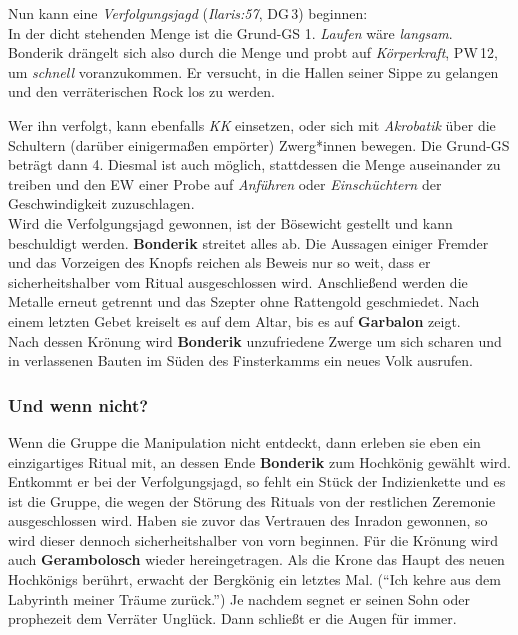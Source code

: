 Nun kann eine \emph{Verfolgungsjagd} (\emph{Ilaris:57}, DG\,3) beginnen:\\
In der dicht stehenden Menge ist die Grund-GS 1. \emph{Laufen} wäre \emph{langsam}.
Bonderik drängelt sich also durch die Menge und probt auf \emph{Körperkraft}, PW\,12, um \emph{schnell} voranzukommen. Er versucht, in die Hallen seiner Sippe zu gelangen und den verräterischen Rock los zu werden.

Wer ihn verfolgt, kann ebenfalls \emph{KK} einsetzen, oder sich mit \emph{Akrobatik} über die Schultern (darüber einigermaßen empörter) Zwerg*innen bewegen. Die Grund-GS beträgt dann 4. Diesmal ist auch möglich, stattdessen die Menge auseinander zu treiben und den EW einer Probe auf \emph{Anführen} oder \emph{Einschüchtern} der Geschwindigkeit zuzuschlagen.\\
Wird die Verfolgungsjagd gewonnen, ist der Bösewicht gestellt und kann beschuldigt werden.
\textbf{Bonderik} streitet alles ab. Die Aussagen einiger Fremder und das Vorzeigen des Knopfs reichen als Beweis nur so weit, dass er sicherheitshalber vom Ritual ausgeschlossen wird. Anschließend werden die Metalle erneut getrennt und das Szepter ohne Rattengold geschmiedet. Nach einem letzten Gebet kreiselt es auf dem Altar, bis es auf \textbf{Garbalon} zeigt.\\
Nach dessen Krönung wird \textbf{Bonderik} unzufriedene Zwerge um sich scharen und in verlassenen Bauten im Süden des Finsterkamms ein neues Volk ausrufen.
\subsubsection{Und wenn nicht?}
Wenn die Gruppe die Manipulation nicht entdeckt, dann erleben sie eben ein einzigartiges Ritual mit, an dessen Ende \textbf{Bonderik} zum Hochkönig gewählt wird.
Entkommt er bei der Verfolgungsjagd, so fehlt ein Stück der Indizienkette und es ist die Gruppe, die wegen der Störung des Rituals von der restlichen Zeremonie ausgeschlossen wird.
Haben sie zuvor das Vertrauen des Inradon gewonnen, so wird dieser dennoch sicherheitshalber von vorn beginnen.
Für die Krönung wird auch \textbf{Gerambolosch} wieder hereingetragen.
Als die Krone das Haupt des neuen Hochkönigs berührt, erwacht der Bergkönig ein letztes Mal. (\enquote{Ich kehre aus dem Labyrinth meiner Träume zurück.}) Je nachdem segnet er seinen Sohn oder prophezeit dem Verräter Unglück.
Dann schließt er die Augen für immer.

